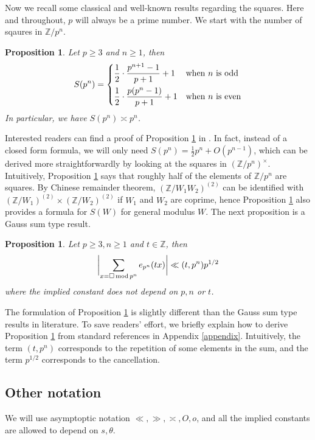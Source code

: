 \documentclass[11pt]{amsart}
\theoremstyle{plain} %
\newtheorem{prop}[thm]{Proposition}
\theoremstyle{remark}
\numberwithin{equation}{section}
\newcommand{\Z}{\mathbb{Z}}
\DeclarePairedDelimiter\abs{\lvert}{\rvert}
\newcommand{\sqp}[1]{\sum_{#1=\square\,\mathrm{mod}\,p^n}}
\begin{document}
Now we recall some classical and well-known results regarding the squares. Here and throughout, $p$ will always be a prime number. We start with the number of sqaures in $\Z/p^n$.  

\begin{prop}\label{number of squares}
    Let $p\geq 3$ and $n\geq 1$, then
    \begin{equation*}
        S(p^n)=\begin{dcases}
            \frac{1}{2}\cdot\frac{p^{n+1}-1}{p+1}+1&\text{when $n$ is odd}\\            
            \frac{1}{2}\cdot\frac{p(p^n-1)}{p+1}+1&\text{when $n$ is even}
        \end{dcases}
    \end{equation*}
    In particular, we have $S(p^n)\asymp p^n$.
\end{prop}

Interested readers can find a proof of Proposition \ref{number of squares} in \cite{Stangl}. In fact, instead of a closed form formula, we will only need $S(p^n)=\frac{1}{2}p^n+O(p^{n-1})$, which can be derived more straightforwardly by looking at the squares in $(\Z/p^n)^{\times}$. Intuitively, Proposition \ref{number of squares} says that roughly half of the elements of $\Z/p^n$ are squares. By Chinese remainder theorem, $(\Z/W_1W_2)^{(2)}$ can be identified with $(\Z/W_1)^{(2)}\times(\Z/W_2)^{(2)}$ if $W_1$ and $W_2$ are coprime, hence Proposition \ref{number of squares} also provides a formula for $S(W)$ for general modulus $W$. The next proposition is a Gauss sum type result.

\begin{prop}\label{Gauss}
    Let $p\geq3,n\geq1$ and $t\in \Z$, then 
    \begin{equation*}
        \abs[\bigg]{\sqp{x}e_{p^n}(tx)}\ll (t,p^n)p^{1/2}
    \end{equation*}
    where the implied constant does not depend on $p,n$ or $t$.
\end{prop}

The formulation of Proposition \ref{Gauss} is slightly different than the Gauss sum type results in literature. To save readers' effort, we briefly explain how to derive Proposition \ref{Gauss} from standard references in Appendix \ref{appendix}. Intuitively, the term $(t,p^n)$ corresponds to the repetition of some elements in the sum, and the term $p^{1/2}$ corresponds to the cancellation.

\subsection{Other notation}
We will use asymptoptic notation $\ll,\gg,\asymp,O,o$, and all the implied constants are allowed to depend on $s,\theta$.
\end{document}
